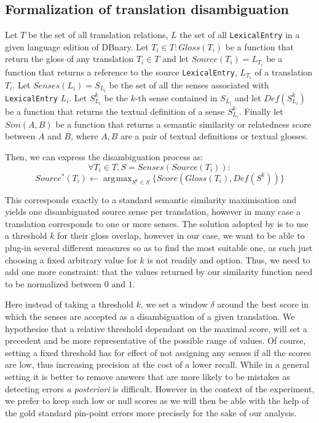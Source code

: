 \documentclass[10pt, a4paper]{article}
\DeclareMathOperator*{\argmax}{arg\!\max}
\begin{document}
\subsection{Formalization of translation disambiguation}
Let \(T\) be the set of all translation relations, \(L\) the set of all \verb|LexicalEntry| in a given language edition of DBnary. Let \(T_i\in T: Gloss(T_i)\) be a function that return the gloss of any translation \(T_i\in T\) and let \(Source(T_i)=L_{T_i}\) be a function that returns a reference to the source \verb|LexicalEntry|, \(L_{T_i}\) of a translation \(T_i\). Let \(Senses(L_i)=S_{L_i}\) be the set of all the senses associated with \verb|LexicalEntry| \(L_i\). Let \(S_{L_i}^k\) be the \(k\)-th sense contained in \(S_{L_i}\) and let \(Def(S_{L_i}^k)\) be a function that returns the textual definition of a sense \(S_{L_i}^k\). Finally let \(Sim(A,B)\) be a function that returns a semantic similarity or relatedness score between \(A\) and \(B\), where \(A,B\) are a pair of textual definitions or textual glosses. 

Then, we can express the disambiguation process as:
\[
\forall T_i \in T, S=Senses(Source(T_i)): 
\]
\[
Source^*(T_i) \leftarrow  \argmax_{S^k\in S} \{Score(Gloss(T_i),Def(S^k))\}
\]

This corresponds exactly to a standard semantic similarity maximisation and yields one disambiguated source sense per translation, however in many case a translation corresponds to one or more senses. The solution adopted by \cite{MeyerGurevych:oup2012} is to use a threshold \(k\) for their gloss overlap, however in our case, we want to be able to plug-in several different measures so as to find the most suitable one, as such just choosing a fixed arbitrary value for \(k\) is not readily and option. Thus, we need to add one more constraint: that the values returned by our similarity function need to be normalized between \(0 \mbox{ and  } 1\).

Here instead of taking a threshold \(k\), we set a window \(\delta\) around the best score in which the senses are accepted as a disambiguation of a given translation. We hypothesise that a relative threshold dependant on the maximal score, will set a precedent and be more representative of the possible range of values. Of course, setting a fixed threshold has for effect of not assigning any senses if all the scores are low, thus increasing precision at the cost of a lower recall. While in a general setting it is better to remove answers that are more likely to be mistakes as detecting errors \emph{a posteriori} is difficult. However in the context of the experiment, we prefer to keep such low or null scores as we will then be able with the help of the gold standard pin-point errors more precisely for the sake of our analysis.
\end{document}
